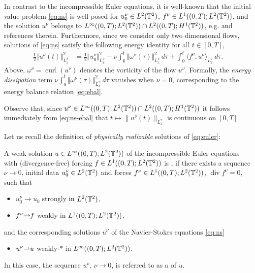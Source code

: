 \documentclass[reqno,12pt]{amsart}
\DeclareMathOperator{\dv}{div}
\DeclareMathOperator{\curl}{curl}
\begin{document}
In contrast to the incompressible Euler equations, it is well-known that the initial value problem \eqref{eq:ns} is well-posed for $u^\nu_0\in L^2(\mathbb{T}^2)$, $f^\nu \in L^1 ((0,T);L^2 (\mathbb{T}^2))$, and the  solution $u^\nu$ belongs to $ L^\infty ((0,T);L^2 (\mathbb{T}^2)) \cap L^2 ((0,T);H^1 (\mathbb{T}^2))$, e.g. \cite{Lions} and references therein. Furthermore, since we consider only two dimensional flows, solutions of \eqref{eq:ns} satisfy the following energy identity for all $t\in [0,T]$,
\begin{align}
\label{eq:ns-ebal}
  \frac12\Vert u^\nu(t) \Vert^2_{L^2_x}
  &=
  \frac12\Vert u_0^\nu \Vert_{L^2_x}^2
  -\nu \int_0^t \Vert \omega^\nu(\tau) \Vert^2_{L^2_x} \, d\tau
  + \int_0^t \langle f^\nu, u^\nu \rangle_{L^2_x} \, d\tau .
\end{align}
 Above, $\omega^\nu = \curl(u^\nu)$ denotes the vorticity of the flow $u^\nu$. Formally, the \emph{energy dissipation} term $\nu \int_0^t \Vert \omega^\nu(\tau) \Vert_{L^2_x}^2 \, d\tau$ vanishes when $\nu = 0$, corresponding to the energy balance relation \eqref{eq:ebal}.

 \begin{remark} \label{viscencont}
 Observe that, since $u^\nu \in L^\infty ((0,T);L^2 (\mathbb{T}^2)) \cap L^2 ((0,T);H^1 (\mathbb{T}^2))$ it follows immediately from \eqref{eq:ns-ebal} that $t \mapsto \| u^\nu(t)\|_{L^2_x}$ is continuous on $[0,T]$. \end{remark}

Let us recall the definition of \emph{physically realizable} solutions of \eqref{eq:euler}:
\begin{definition} \label{def:physrealwsoln}
A weak solution $u \in L^\infty ((0,T);L^2 (\mathbb{T}^2))$ of the incompressible Euler equations with (divergence-free) forcing $f\in L^1 ((0,T);L^2 (\mathbb{T}^2))$ is , if there exists a sequence $\nu \to 0$, initial data $u_0^\nu \in L^2 (\mathbb{T}^2)$ and forces $f^\nu \in L^1 ((0,T); L^2 (\mathbb{T}^2))$, $\dv f^\nu = 0$, such that
\begin{itemize}
\item $u_0^\nu \to u_0$ strongly in $L^2 (\mathbb{T}^2)$,
\item $f^\nu {\rightharpoonup} f$ weakly in $L^1 ((0,T); L^2 (\mathbb{T}^2))$,
\end{itemize}
and the corresponding solutions $u^\nu$ of the Navier-Stokes equations \eqref{eq:ns}
\begin{itemize}
\item $u^\nu {\rightharpoonup} u$ weakly-$\ast$ in $L^\infty ((0,T);L^2  (\mathbb{T}^2))$.
  \end{itemize}
In this case, the sequence $u^\nu$, $\nu \to 0$, is referred to as a  of $u$.
\end{definition}
\end{document}
